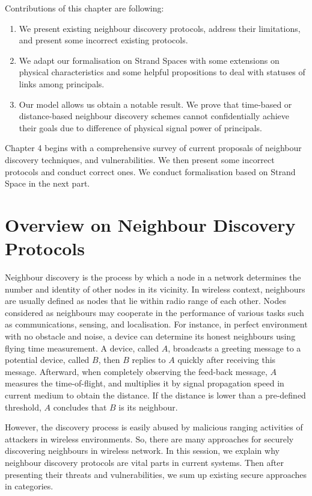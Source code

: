 Contributions of this chapter are following:
\begin{enumerate}
\item We present existing neighbour discovery protocols, address their limitations, and present some incorrect existing protocols.  
\item We adapt our formalisation on Strand Spaces with some extensions on physical characteristics and some helpful propositions to deal with statuses of links among principals. 
\item Our model allows us obtain a notable result. We prove that time-based or distance-based neighbour discovery schemes cannot confidentially achieve their goals due to difference of physical signal power of principals. 
\end{enumerate}

Chapter 4 begins with a comprehensive survey of current proposals of neighbour discovery techniques, and vulnerabilities. We then present some incorrect protocols and conduct correct ones. We conduct formalisation based on Strand Space in the next part.  
 
 \section{Overview on Neighbour Discovery Protocols}

Neighbour discovery is the process by which a node in a network determines the number and identity of other nodes in its vicinity. In wireless context, neighbours are usually defined as nodes that lie within radio range of each other. Nodes considered as neighbours may cooperate in the performance of various tasks such as communications, sensing, and localisation. For instance, in perfect environment with no obstacle and noise, a device can determine its honest neighbours using flying time measurement. A device, called $A$, broadcasts a greeting message to a potential device, called $B$, then $B$ replies to $A$ quickly after receiving this message. Afterward, when completely observing the feed-back message, $A$ measures the time-of-flight, and multiplies it by signal propagation speed in current medium to obtain the distance. If the distance is lower than a pre-defined threshold, $A$ concludes that $B$ is its neighbour.

However, the discovery process is easily abused by malicious ranging activities of attackers in wireless environments. So, there are many approaches for securely discovering neighbours in wireless network. In this session, we explain why neighbour discovery protocols are vital parts in current systems. Then after presenting their threats and vulnerabilities, we sum up existing secure approaches in categories.


